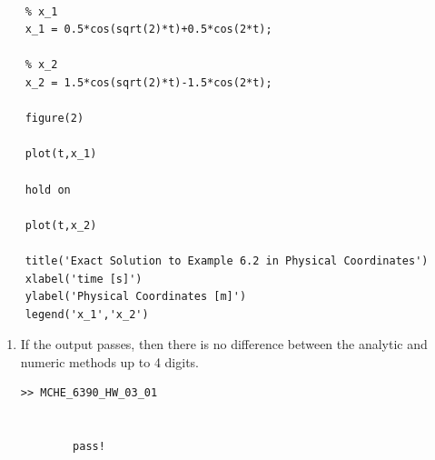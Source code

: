 \documentclass{article}
\begin{document}
\begin{enumerate}
\begin{lstlisting}[style=Matlab-editor]
    %% Part c.
    
    % x_1
    x_1 = 0.5*cos(sqrt(2)*t)+0.5*cos(2*t);
    
    % x_2
    x_2 = 1.5*cos(sqrt(2)*t)-1.5*cos(2*t);
    
    figure(2)
    
    plot(t,x_1)
    
    hold on
    
    plot(t,x_2)
    
    title('Exact Solution to Example 6.2 in Physical Coordinates')
    xlabel('time [s]')
    ylabel('Physical Coordinates [m]')
    legend('x_1','x_2')
    \end{lstlisting}
    \begin{enumerate}
        \item
        If the output passes, then there is no difference between the analytic and numeric methods up to 4 digits.
        \begin{lstlisting}[style=Matlab-editor]
        >> MCHE_6390_HW_03_01
        
        
        pass!
        

\end{lstlisting}
\end{enumerate}
\end{enumerate}
\end{document}
